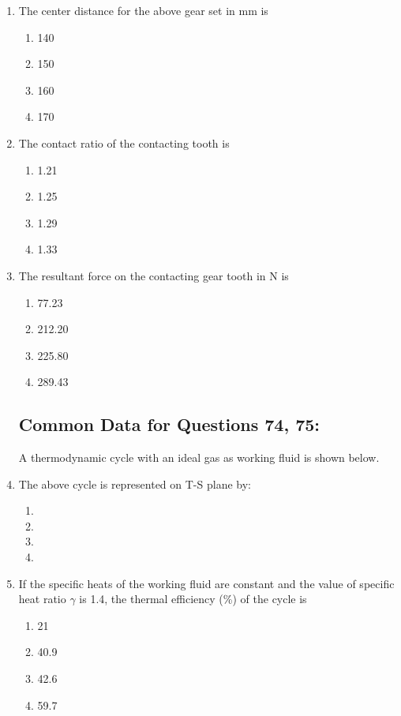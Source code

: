 \documentclass[journal,12pt,onecolumn]{IEEEtran}
\theoremstyle{remark}
\begin{document}
\begin{enumerate}
\item The center distance for the above gear set in mm is  
\begin{enumerate}
    \item 140
    \item 150
    \item 160
    \item 170
\end{enumerate}

\item The contact ratio of the contacting tooth is  
\begin{enumerate}
    \item 1.21
    \item 1.25
    \item 1.29
    \item 1.33
\end{enumerate}

\item The resultant force on the contacting gear tooth in N is  
\begin{enumerate}
    \item 77.23
    \item 212.20
    \item 225.80
    \item 289.43
\end{enumerate}

\subsection{Common Data for Questions 74, 75:}

A thermodynamic cycle with an ideal gas as working fluid is shown below.

\item The above cycle is represented on T-S plane by:
	\begin{center}
	
	\end{center}
\begin{enumerate}
	\item 
	\item 
	\item 
	\item 
\end{enumerate}
\item If the specific heats of the working fluid are constant and the value of specific heat ratio $\gamma$ is 1.4, the thermal efficiency (\%) of the cycle is
\begin{enumerate}
	\item 21 
	\item 40.9 
	\item 42.6 
	\item 59.7
\end{enumerate}

\end{enumerate}
\end{document}

